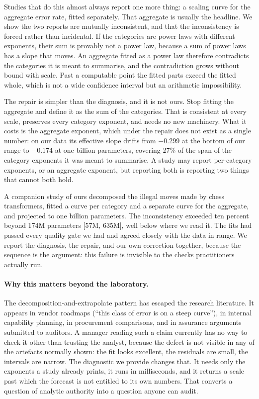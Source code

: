 \documentclass[11pt]{article}
\begin{document}
Studies that do this almost always report one more thing: a scaling curve for the
aggregate error rate, fitted separately. That aggregate is usually the headline. We
show the two reports are mutually inconsistent, and that the inconsistency is forced
rather than incidental. If the categories are power laws with different exponents,
their sum is provably not a power law, because a sum of power laws has a slope that
moves. An aggregate fitted as a power law therefore contradicts the categories it is
meant to summarise, and the contradiction grows without bound with scale. Past a
computable point the fitted parts exceed the fitted whole, which is not a wide
confidence interval but an arithmetic impossibility.

The repair is simpler than the diagnosis, and it is not ours. Stop fitting the
aggregate and define it as the sum of the categories. That is consistent at every
scale, preserves every category exponent, and needs no new machinery. What it costs
is the aggregate exponent, which under the repair does not exist as a single number:
on our data its effective slope drifts from $-$0.299 at the bottom of
our range to $-$0.174 at one billion parameters, covering
27\% of the span of the category exponents it was meant to
summarise. A study may report per-category exponents, or an aggregate exponent, but
reporting both is reporting two things that cannot both hold.

A companion study of ours
\citep{rathore2026scale}{} decomposed the illegal
moves made by chess transformers, fitted a curve per category and a separate curve
for the aggregate, and projected to one billion parameters. The inconsistency
exceeded ten percent beyond 174M parameters
[57M, 635M], well below where we read it. The
fits had passed every quality gate we had and agreed closely with the data in range.
We report the diagnosis, the repair, and our own correction together, because the
sequence is the argument: this failure is invisible to the checks practitioners
actually run.

\paragraph{Why this matters beyond the laboratory.}
The decomposition-and-extrapolate pattern has escaped the research literature. It
appears in vendor roadmaps (``this class of error is on a steep curve''), in
internal capability planning, in procurement comparisons, and in assurance
arguments submitted to auditors. A manager reading such a claim currently has no
way to check it other than trusting the analyst, because the defect is not visible
in any of the artefacts normally shown: the fit looks excellent, the residuals are
small, the intervals are narrow. The diagnostic we provide changes that. It needs
only the exponents a study already prints, it runs in milliseconds, and it returns
a scale past which the forecast is not entitled to its own numbers. That converts a
question of analytic authority into a question anyone can audit.
\end{document}
